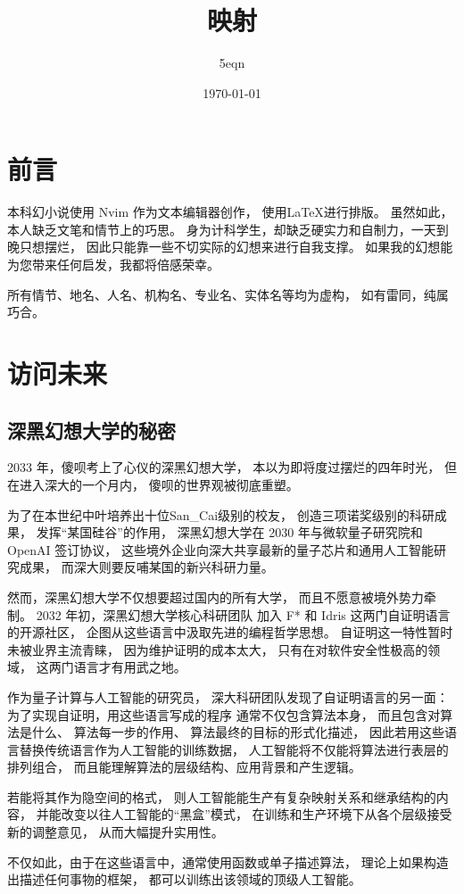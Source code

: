 \documentclass[UTF8,a4paper,11pt]{ctexart}
\title{映射}
\author{5eqn}
\date{\today}
\newcommand{\p}{傻呗} %
\newcommand{\X}{深黑幻想大学} %
\newcommand{\x}{深大} %
\newcommand{\y}{某国} %
\newcommand{\z}{San\_Cai} %
\begin{document}
\maketitle
\section{前言}
本科幻小说使用 Nvim 作为文本编辑器创作，
使用\LaTeX 进行排版。
虽然如此，本人缺乏文笔和情节上的巧思。
身为计科学生，却缺乏硬实力和自制力，一天到晚只想摆烂，
因此只能靠一些不切实际的幻想来进行自我支撑。
如果我的幻想能为您带来任何启发，我都将倍感荣幸。

所有情节、地名、人名、机构名、专业名、实体名等均为虚构，
如有雷同，纯属巧合。

\section{访问未来}
\subsection{\X 的秘密}
2033 年，\p 考上了心仪的\X ，
本以为即将度过摆烂的四年时光，
但在进入\x 的一个月内，
\p 的世界观被彻底重塑。

为了在本世纪中叶培养出十位\z 级别的校友，
创造三项诺奖级别的科研成果，
发挥“\y 硅谷”的作用，
\X 在 2030 年与微软量子研究院和
OpenAI 签订协议，
这些境外企业向\x 共享最新的量子芯片和通用人工智能研究成果，
而\x 则要反哺\y 的新兴科研力量。

然而，\X 不仅想要超过国内的所有大学，
而且不愿意被境外势力牵制。
2032 年初，\X 核心科研团队
加入 F* 和 Idris 这两门自证明语言的开源社区，
企图从这些语言中汲取先进的编程哲学思想。
自证明这一特性暂时未被业界主流青睐，
因为维护证明的成本太大，
只有在对软件安全性极高的领域，
这两门语言才有用武之地。

作为量子计算与人工智能的研究员，
\x 科研团队发现了自证明语言的另一面：
为了实现自证明，用这些语言写成的程序
通常不仅包含算法本身，
而且包含对算法是什么、
算法每一步的作用、
算法最终的目标的形式化描述，
因此若用这些语言替换传统语言作为人工智能的训练数据，
人工智能将不仅能将算法进行表层的排列组合，
而且能理解算法的层级结构、应用背景和产生逻辑。

若能将其作为隐空间的格式，
则人工智能能生产有复杂映射关系和继承结构的内容，
并能改变以往人工智能的“黑盒”模式，
在训练和生产环境下从各个层级接受新的调整意见，
从而大幅提升实用性。

不仅如此，由于在这些语言中，通常使用函数或单子描述算法，
理论上如果构造出描述任何事物的框架，
都可以训练出该领域的顶级人工智能。
\end{document}
